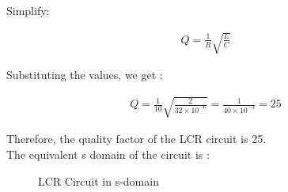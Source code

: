 \documentclass[journal,12pt,twocolumn]{IEEEtran}
\theoremstyle{remark}
\begin{document}
Simplify:

\begin{align}
 Q = \frac{1}{R}\sqrt{\frac{L}{C}} 
\end{align}

Substituting the values, we get :

\begin{align}
Q = \frac{1}{10}\sqrt{\frac{2}{32 \times 10^{-6}}} = \frac{1}{40 \times 10^{-3}} = 25
\end{align}

Therefore, the quality factor of the LCR circuit is 25.\\


The equivalent s domain of the circuit is :

\begin{figure}[h]
 \centering
    
    \caption{LCR Circuit in s-domain}
    
\end{figure}
\end{document}
